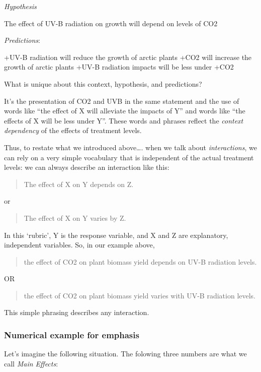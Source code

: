 \documentclass[
]{book}
\begin{document}
\emph{Hypothesis}

The effect of UV-B radiation on growth will depend on levels of CO2

\emph{Predictions}:

+UV-B radiation will reduce the growth of arctic plants
+CO2 will increase the growth of arctic plants
+UV-B radiation impacts will be less under +CO2

What is unique about this context, hypothesis, and predictions?

It's the presentation of CO2 and UVB in the same statement and the use of words like ``the effect of X will alleviate the impacts of Y'' and words like ``the effects of X will be less under Y''. These words and phrases reflect the \emph{context dependency} of the effects of treatment levels.

Thus, to restate what we introduced above\ldots. when we talk about \emph{interactions}, we can rely on a very simple vocabulary that is independent of the actual treatment levels: we can always describe an interaction like this:

\begin{quote}
The effect of X on Y depends on Z.
\end{quote}

or

\begin{quote}
The effect of X on Y varies by Z.
\end{quote}

In this `rubric', Y is the response variable, and X and Z are explanatory, independent variables. So, in our example above,

\begin{quote}
the effect of CO2 on plant biomass yield depends on UV-B radiation levels.
\end{quote}

OR

\begin{quote}
the effect of CO2 on plant biomass yield varies with UV-B radiation levels.
\end{quote}

This simple phrasing describes any interaction.

\subsubsection{Numerical example for emphasis}\label{numerical-example-for-emphasis}

Let's imagine the following situation. The folowing three numbers are what we call \emph{Main Effects}:
\end{document}
